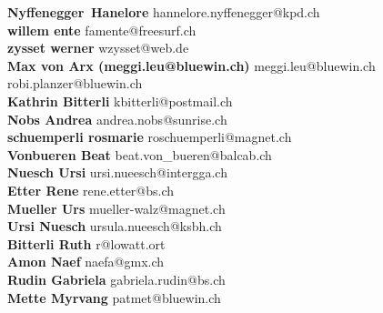 \documentclass{scrartcl}
\begin{document}
\textbf{Nyffenegger\, Hanelore } hannelore.nyffenegger@kpd.ch\\
\textbf{willem ente } famente@freesurf.ch\\
\textbf{zysset werner } wzysset@web.de\\
\textbf{Max von Arx (meggi.leu@bluewin.ch) } meggi.leu@bluewin.ch\\
\textbf{} robi.planzer@bluewin.ch\\
\textbf{Kathrin Bitterli } kbitterli@postmail.ch\\
\textbf{Nobs Andrea } andrea.nobs@sunrise.ch\\
\textbf{schuemperli rosmarie } roschuemperli@magnet.ch\\
\textbf{Vonbueren Beat } beat.von_bueren@balcab.ch\\
\textbf{Nuesch Ursi } ursi.nueesch@intergga.ch\\
\textbf{Etter Rene } rene.etter@bs.ch\\
\textbf{Mueller Urs } mueller-walz@magnet.ch\\
\textbf{Ursi Nuesch } ursula.nueesch@ksbh.ch\\
\textbf{Bitterli Ruth } r@lowatt.ort\\
\textbf{Amon Naef } naefa@gmx.ch\\
\textbf{Rudin Gabriela } gabriela.rudin@bs.ch\\
\textbf{Mette Myrvang } patmet@bluewin.ch\\
\end{document}
